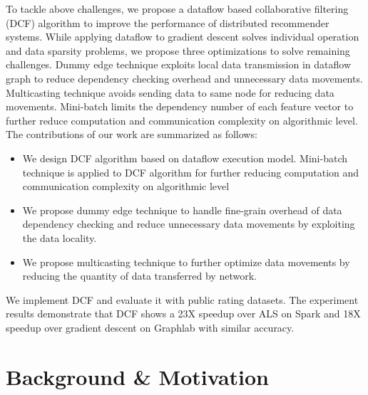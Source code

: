 \documentclass{llncs}
\begin{document}
To tackle above challenges, we propose a dataflow based collaborative filtering (DCF) algorithm to improve the performance of distributed recommender systems. While applying dataflow to gradient descent solves individual operation and data sparsity problems, we propose three optimizations to solve remaining challenges. Dummy edge technique exploits local data transmission in dataflow graph to reduce dependency checking overhead and unnecessary data movements. Multicasting technique avoids sending data to same node for reducing data movements. Mini-batch limits the dependency number of each feature vector to further reduce computation and communication complexity on algorithmic level. The contributions of our work are summarized as follows:
\vspace{-5pt}
\begin{itemize}
\item
We design DCF algorithm based on dataflow execution model.
Mini-batch technique is applied to DCF algorithm for further reducing computation and communication complexity on algorithmic level
\item
We propose dummy edge technique to handle fine-grain overhead of data dependency checking and reduce unnecessary data movements by exploiting the data locality.
\item
We propose multicasting technique to further optimize data movements by reducing the quantity of data transferred by network.
\end{itemize}
\vspace{-5pt}

We implement DCF and evaluate it with public rating datasets. The experiment results demonstrate that DCF shows a 23X speedup over ALS on Spark and 18X speedup over gradient descent on Graphlab with similar accuracy.

\vspace{-10pt}

\section{Background \& Motivation}
\vspace{-10pt}
\end{document}
